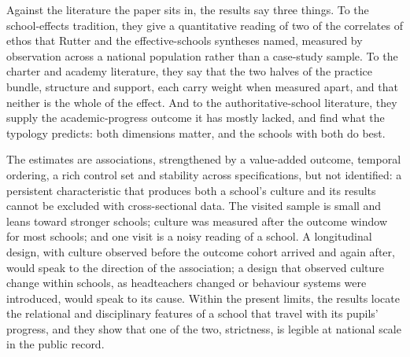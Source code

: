 Against the literature the paper sits in, the results say three things. To
the school-effects tradition, they give a quantitative reading of two of the
correlates of ethos that Rutter and the effective-schools syntheses named,
measured by observation across a national population rather than a case-study
sample. To the charter and academy literature, they say that the two halves
of the practice bundle, structure and support, each carry weight when
measured apart, and that neither is the whole of the effect. And to the
authoritative-school literature, they supply the academic-progress outcome it
has mostly lacked, and find what the typology predicts: both dimensions
matter, and the schools with both do best.

The estimates are associations, strengthened by a value-added outcome,
temporal ordering, a rich control set and stability across specifications, but
not identified: a persistent characteristic that produces both a school's
culture and its results cannot be excluded with cross-sectional data. The
visited sample is small and leans toward stronger schools; culture was
measured after the outcome window for most schools; and one visit is a noisy
reading of a school. A longitudinal design, with culture observed before the
outcome cohort arrived and again after, would speak to the direction of the
association; a design that observed culture change within schools, as
headteachers changed or behaviour systems were introduced, would speak to
its cause. Within the present limits, the results locate the relational and
disciplinary features of a school that travel with its pupils' progress, and
they show that one of the two, strictness, is legible at national scale in
the public record.
